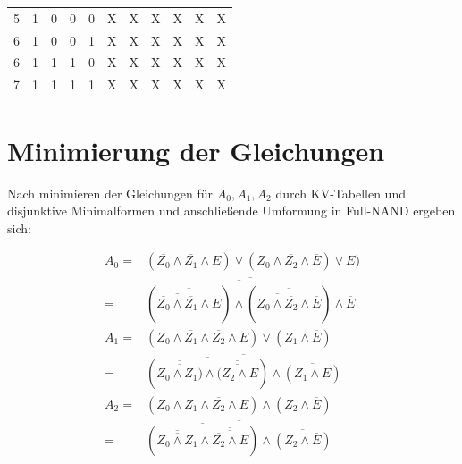 \documentclass[
    paper=a4,
]{scrartcl}
\begin{document}
\begin{table}[h]
\begin{tabular}{r|*{3}{l}|l|*{3}{l}|*{3}{l}}
            5           &   1       &   0       &   0       &   0       &   X       &   X       &   X       &   X       &   X       &   X\\
            6           &   1       &   0       &   0       &   1       &   X       &   X       &   X       &   X       &   X       &   X\\
            6           &   1       &   1       &   1       &   0       &   X       &   X       &   X       &   X       &   X       &   X\\
            7           &   1       &   1       &   1       &   1       &   X       &   X       &   X       &   X       &   X       &   X\\\bottomrule
        \end{tabular}
    \end{table}

\section{Minimierung der Gleichungen}
    \label{sec:1}
    Nach minimieren der Gleichungen für \(A_0, A_1, A_2\) durch KV-Tabellen und disjunktive Minimalformen und anschließende Umformung in Full-NAND ergeben sich:

    \begin{align*}
        A_0 =&   (\overline{Z_0}\wedge \overline{Z_1}\wedge E) \vee (Z_0 \wedge \overline{Z_2} \wedge \overline{E}) \vee E)\\
            =& \overline{\overline{\overline{ ( \overline{\overline{\overline{\overline{Z_0} \wedge \overline{Z_1}}} \wedge E} ) \wedge ( \overline{\overline{\overline{Z_0 \wedge \overline{Z_2}}} \wedge \overline{E}} ) }} \wedge \overline{E}}\\
        A_1 =&  (Z_0 \wedge \overline{Z_1} \wedge \overline{Z_2} \wedge E) \vee (Z_1 \wedge \overline{E})\\
            =&  \overline{ \overline{ ( \overline{\overline{ Z_0 \wedge \overline{Z_1}  ) }} \wedge \overline{\overline{ ( \overline{Z_2} \wedge E}} ) } \wedge \overline{ (Z_1 \wedge \overline{E} ) } } \\
        A_2 =&  (Z_0 \wedge Z_1 \wedge \overline{Z_2} \wedge E ) \wedge ( Z_2 \wedge \overline{E} ) \\
            =&  \overline{ \overline{ ( \overline{\overline{Z_0 \wedge Z_1}} \wedge \overline{\overline{\overline{Z_2} \wedge E}} ) } \wedge \overline{ ( Z_2 \wedge \overline{E} ) }}\\
    \end{align*}
\end{document}
